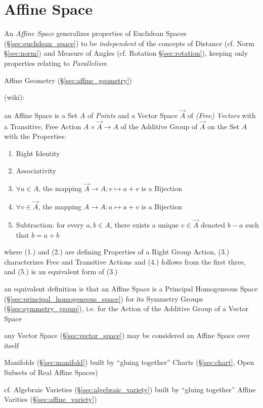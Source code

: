 \section{Affine Space}\label{sec:affine_space}

An \emph{Affine Space} generalizes properties of Euclidean Spaces
(\S\ref{sec:euclidean_space}) to be \emph{independent} of the concepts of
Distance (cf. Norm \S\ref{sec:norm}) and Measure of Angles (cf. Rotation
\S\ref{sec:rotation}), keeping only properties relating to
\emph{Parallelism}

\fist Affine Geometry (\S\ref{sec:affine_geometry})

(wiki):

an Affine Space is a Set $A$ of \emph{Points} and a Vector Space $\vec{A}$ of
\emph{(Free) Vectors} with a Transitive, Free Action
$A \times \vec{A} \rightarrow A$ of the Additive Group of $\vec{A}$ on the
Set $A$ with the Properties:
\begin{enumerate}
\item Right Identity
\item Associativity
\item $\forall a \in A$, the mapping $\vec{A} \rightarrow A; v \mapsto a + v$ is
  a Bijection
\item $\forall v \in \vec{A}$, the mapping $A \rightarrow A : a \mapsto a + v$
  is a Bijection
\item Subtraction: for every $a, b \in A$, there exists a unique $v \in \vec{A}$
  denoted $b - a$ such that $b = a + b$
\end{enumerate}
where (1.) and (2.) are defining Properties of a Right Group Action, (3.)
characterizes Free and Transitive Actions and (4.) follows from the first three,
and (5.) is an equivalent form of (3.)

an equivalent definition is that an Affine Space is a Principal Homogeneous
Space (\S\ref{sec:principal_homogeneous_space}) for its Symmetry Groups
(\S\ref{sec:symmetry_group}), i.e. for the Action of the Additive Group of a
Vector Space

any Vector Space (\S\ref{sec:vector_space}) may be considered an Affine Space
over itself

Manifolds (\S\ref{sec:manifold}) built by ``gluing together'' Charts
(\S\ref{sec:chart}, Open Subsets of Real Affine Spaces)

cf. Algebraic Varieties (\S\ref{sec:algebraic_variety}) built by ``gluing
together'' Affine Varities (\S\ref{sec:affine_variety})

